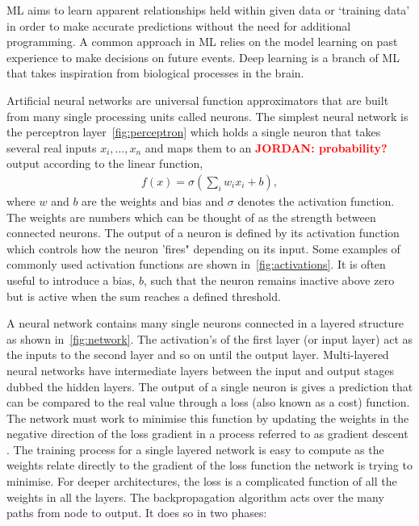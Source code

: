 \documentclass[12pt]{iopart}
\newcommand{\jordan}[1]{\textbf{\textcolor{red}{JORDAN: #1}}}
\newcommand{\chris}[1]{\textbf{\textcolor{green}{CHRIS: #1}}}
\begin{document}
\ac{ML} aims to learn apparent relationships held within given data or `training
data' in order to make accurate predictions without the need for additional
programming. A common approach in \ac{ML} relies on the model learning on
past experience to make decisions on future events. Deep learning is a branch of \ac{ML} that takes inspiration from biological processes in the brain. 

%

Artificial neural networks are universal function approximators that are built from many single
processing units called neurons. The simplest neural network is the perceptron
layer~\cref{fig:perceptron} which holds a single neuron that takes several real
inputs $x_{i},\ldots, x_{n}$
and maps them to an \jordan{probability?} output according to the linear function, 
%
\begin{align}
f(x) = \sigma(\sum_i w_i x_i + b),
\label{eqn:neuron}
\end{align}
%
where $w$ and $b$ are the weights and bias and $\sigma$
denotes the activation function. The weights are numbers which can be thought
of as the strength between connected neurons. The output of a neuron is defined by its activation function which controls how the neuron 'fires" depending on its input. Some examples of commonly used activation functions are shown in~\cref{fig:activations}. It is often useful to introduce a bias, $b$, such that the neuron remains inactive
above zero but is active when the sum reaches a defined threshold. 

%
A neural network contains many single neurons connected in a layered structure
as shown in~\cref{fig:network}. The activation's of the first layer (or
input layer) act as the inputs to the second layer and so on until the output
layer. Multi-layered neural networks have intermediate layers between the input
and output stages dubbed the hidden layers.
%
The output of a single neuron is gives a
prediction that can be compared to the real value through a loss (also known as a
cost) function. The network must work to minimise this function by updating the weights in the negative
direction of the loss gradient in a process referred to as gradient
descent \cite{ruder2016overview}. The training process for a single layered network is easy to compute as the weights relate directly to the gradient of the loss function the network is trying to minimise. For deeper architectures, the loss is a complicated function of all the weights in all the layers. The backpropagation \cite{Nielsen1992} algorithm acts over the many paths from node to output. It does so in two phases:
\end{document}
